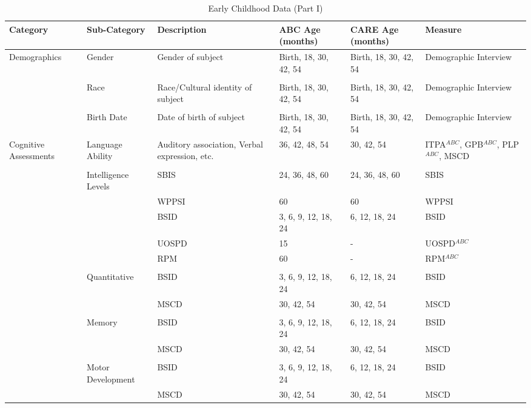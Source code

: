 \begin{sidewaystable}[H]
\small
\caption{Early Childhood Data (Part I)}
\label{tab:ecvars_1}
\centering
\begin{adjustbox}{max width=\textwidth, max height=\textheight,keepaspectratio}
\begin{threeparttable}
\tiny
\begin{tabular}{L{3cm} C{3.5cm} C{4cm} C{1.5cm} C{1.5cm}  C{6cm}}
\toprule
\textbf{Category}	&	\textbf{Sub-Category}	&	\textbf{Description}	&	\textbf{ABC Age (months)}  	&  \textbf{CARE Age (months)}  & 	\textbf{Measure}	\\ \midrule
Demographics	&	Gender	&	Gender of subject	&	Birth, 18, 30, 42, 54	&	 Birth, 18, 30, 42, 54	&	Demographic Interview	\\
	&	\\
	&	Race	&	Race/Cultural identity of subject	&	Birth, 18, 30, 42, 54	&	 Birth, 18, 30, 42, 54	&	 Demographic Interview\\
	&	\\
	&	Birth Date	&	Date of birth of subject	&	Birth, 18, 30, 42, 54	& 	Birth, 18, 30, 42, 54	&	 Demographic Interview	\\ \midrule
Cognitive Assessments	&	Language Ability	&	Auditory association, Verbal expression, etc. 	&	36, 42, 48, 54	&	30, 42, 54	&	ITPA$^{ABC}$, GPB$^{ABC}$, PLP$^{ABC}$, MSCD \\
	&	\\
	&	Intelligence Levels	&	SBIS 	&	24, 36, 48, 60	&	24, 36, 48, 60	&	SBIS	\\
	&		&	WPPSI	&	60	&	60	&	WPPSI	\\
	&		&	BSID 	&	3, 6, 9, 12, 18, 24	&	6, 12, 18, 24		&	BSID	\\
	&		&	UOSPD	&	15	&	- 	&	UOSPD$^{ABC}$	\\
	&		&	RPM	&	60	&	-	&	RPM$^{ABC}$	\\
	&	\\
	&	Quantitative	 &	BSID 	&	3, 6, 9, 12, 18, 24	&	6, 12, 18, 24		&	BSID	\\
	&		&	MSCD 	&	30, 42, 54		&	30, 42, 54	&	MSCD	\\
	&	\\
	&	Memory	&	BSID 	&	3, 6, 9, 12, 18, 24	& 	6, 12, 18, 24		&	BSID	\\
	&		&	MSCD 	&	30, 42, 54	&	30, 42, 54	&	MSCD	\\
	&	\\
	&	Motor Development	&	BSID 	&	3, 6, 9, 12, 18, 24	&	6, 12, 18, 24		&	BSID\\
	&		&	MSCD 	&	30, 42, 54	&	30, 42, 54	&	MSCD	\\

\end{tabular}
\end{threeparttable}
\end{adjustbox}
\end{sidewaystable}
